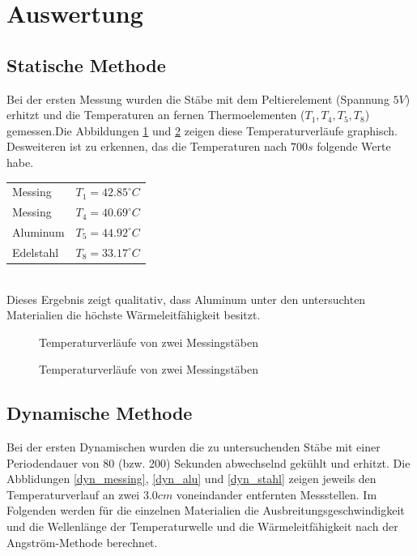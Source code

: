 \documentclass[11pt]{article}
\begin{document}
\section{Auswertung}
\subsection{Statische Methode}

Bei der ersten Messung wurden die Stäbe mit dem Peltierelement (Spannung $5V$) erhitzt und die Temperaturen an fernen Thermoelementen ($T_1, T_4, T_5, T_8$) gemessen.Die Abbildungen \ref{T1T4} und \ref{T5T8} zeigen diese Temperaturverläufe graphisch. Desweiteren ist zu erkennen, das die Temperaturen nach $700s$ folgende Werte habe.

\begin{tabular}{@{$\bullet$  }ll}
Messing &$T_1= 42.85 ^\circ C$\\
Messing &$T_4 =  40.69 ^\circ C$\\
Aluminum &$T_5 = 44.92 ^\circ C$\\
Edelstahl &$T_8 =33.17 ^\circ C$\\

\end{tabular}\\
Dieses Ergebnis zeigt qualitativ, dass Aluminum unter den untersuchten Materialien die höchste Wärmeleitfähigkeit besitzt.

\begin{figure}[H]
\caption{Temperaturverläufe von zwei Messingstäben}
\label{T1T4}
\end{figure}

\begin{figure}[H]
\centering
\caption{Temperaturverläufe von zwei Messingstäben}
\label{T5T8}
\end{figure}
\subsection{Dynamische Methode}
Bei der ersten Dynamischen wurden die zu untersuchenden St\"abe mit einer Periodendauer von 80 (bzw. 200)  Sekunden abwechselnd gek\"uhlt und erhitzt. Die Abblidungen \ref{dyn_messing}, \ref{dyn_alu} und \ref{dyn_stahl} zeigen jeweils den Temperaturverlauf an zwei $3.0cm$ voneindander entfernten Messstellen. Im Folgenden werden f\"ur die einzelnen Materialien die Ausbreitungsgeschwindigkeit und die Wellenl\"ange der Temperaturwelle und die W\"armeleitf\"ahigkeit nach der Angstr\"om-Methode berechnet.
\end{document}
